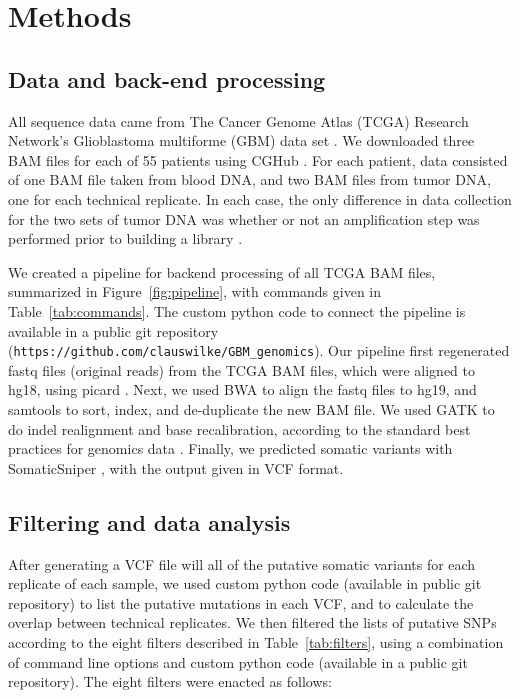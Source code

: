 \documentclass[11pt]{article} %
\begin{document}
{\section*{Methods}

\subsection*{Data and back-end processing}

All sequence data came from The Cancer Genome Atlas (TCGA) Research Network's Glioblastoma multiforme (GBM) data set \citep{TCGA-GBM}. We downloaded three BAM files for each of 55 patients using CGHub \citep{CGHub}. For each patient, data consisted of one BAM file taken from blood DNA, and two BAM files from tumor DNA, one for each technical replicate. In each case, the only difference in data collection for the two sets of tumor DNA was whether or not an amplification step was performed prior to building a library \citep{TCGA-GBM}. 

We created a pipeline for backend processing of all TCGA BAM files, summarized in Figure~\ref{fig:pipeline}, with commands given in Table~\ref{tab:commands}. The custom python code to connect the pipeline is available in a public 
git repository (\texttt{https://github.com/clauswilke/GBM\_genomics}). Our pipeline first regenerated fastq files (original reads) from the TCGA BAM files, which were aligned to hg18, using picard \citep{picard}. Next, we used BWA \citep{bwa} to align the fastq files to hg19, and samtools \citep{SAMtools} to sort, index, and de-duplicate the new BAM file. We used GATK \citep{GATK} to do indel realignment and base recalibration, according to the standard best practices for genomics data \citep{best-practices}. Finally, we predicted somatic variants with SomaticSniper \citep{SomaticSniper}, with the output given in VCF format.

\subsection*{Filtering and data analysis}

After generating a VCF file will all of the putative somatic variants for each replicate of each sample, we used custom python code (available in public git repository) to list the putative mutations in each VCF, and to calculate the overlap between technical replicates. We then filtered the lists of putative SNPs according to the eight filters described in Table~\ref{tab:filters}, using a combination of command line options and custom python code (available in a public git repository). The eight filters were enacted as follows: 

}
\end{document}
